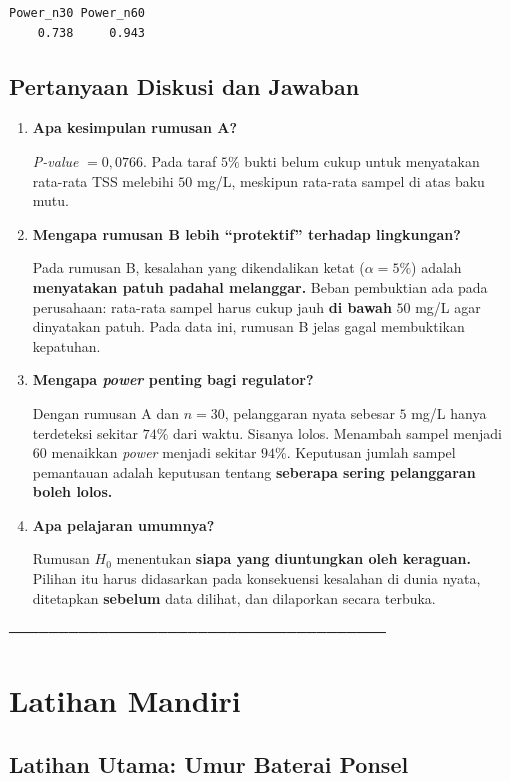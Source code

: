 \documentclass[
  indonesian,
  letterpaper,
]{book}
\begin{document}
\begin{verbatim}
Power_n30 Power_n60 
    0.738     0.943 
\end{verbatim}

\subsection{Pertanyaan Diskusi dan
Jawaban}\label{pertanyaan-diskusi-dan-jawaban-1}

\begin{enumerate}
\def\labelenumi{\arabic{enumi}.}
\item
  \textbf{Apa kesimpulan rumusan A?}

  \emph{P-value} \(= 0{,}0766\). Pada taraf \(5\%\) bukti belum cukup
  untuk menyatakan rata-rata TSS melebihi \(50\) mg/L, meskipun
  rata-rata sampel di atas baku mutu.
\item
  \textbf{Mengapa rumusan B lebih ``protektif'' terhadap lingkungan?}

  Pada rumusan B, kesalahan yang dikendalikan ketat (\(\alpha = 5\%\))
  adalah \textbf{menyatakan patuh padahal melanggar.} Beban pembuktian
  ada pada perusahaan: rata-rata sampel harus cukup jauh \textbf{di
  bawah} \(50\) mg/L agar dinyatakan patuh. Pada data ini, rumusan B
  jelas gagal membuktikan kepatuhan.
\item
  \textbf{Mengapa \emph{power} penting bagi regulator?}

  Dengan rumusan A dan \(n = 30\), pelanggaran nyata sebesar \(5\) mg/L
  hanya terdeteksi sekitar \(74\%\) dari waktu. Sisanya lolos. Menambah
  sampel menjadi \(60\) menaikkan \emph{power} menjadi sekitar \(94\%\).
  Keputusan jumlah sampel pemantauan adalah keputusan tentang
  \textbf{seberapa sering pelanggaran boleh lolos.}
\item
  \textbf{Apa pelajaran umumnya?}

  Rumusan \(H_0\) menentukan \textbf{siapa yang diuntungkan oleh
  keraguan.} Pilihan itu harus didasarkan pada konsekuensi kesalahan di
  dunia nyata, ditetapkan \textbf{sebelum} data dilihat, dan dilaporkan
  secara terbuka.
\end{enumerate}

──────────────────────────────────────

\section{Latihan Mandiri}\label{latihan-mandiri-1}

\subsection{Latihan Utama: Umur Baterai
Ponsel}\label{latihan-utama-umur-baterai-ponsel}
\end{document}

